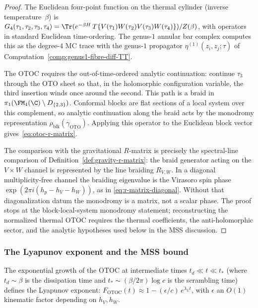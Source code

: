\begin{proof}
The Euclidean four-point function on the thermal cylinder
(inverse temperature~$\beta$) is
$G_4(\tau_1,\tau_2,\tau_3,\tau_4)
= \Tr(e^{-\beta H}\,T\{V(\tau_1)W(\tau_2)V(\tau_3)W(\tau_4)\})
/ Z(\beta)$,
with operators in standard Euclidean time-ordering.
The genus-$1$ annular bar complex computes this as the degree-$4$
MC trace with the genus-$1$ propagator
$\eta^{(1)}(z_i, z_j; \tau)$ of
Computation~\ref{comp:genus1-fibre-diff-TT}.

The OTOC requires the out-of-time-ordered analytic continuation:
continue $\tau_3$ through the OTO sheet so that, in the holomorphic
configuration variable, the third insertion winds once around the
second.  This path is a braid in
\(\pi_1(\FM_4(\C)\setminus D_{\{2,3\}})\).  Conformal blocks are
flat sections of a local system over this complement, so analytic
continuation along the braid acts by the monodromy representation
\(\rho_{\mathrm{blk}}(\gamma_{\mathrm{OTO}})\).  Applying this operator
to the Euclidean block vector gives~\eqref{eq:otoc-r-matrix}.

The comparison with the gravitational \(R\)-matrix is precisely the
spectral-line comparison of Definition~\ref{def:gravity-r-matrix}: the
braid generator acting on the \(V\times W\) channel is represented by
the line braiding \(R_{V,W}\).  In a diagonal multiplicity-free channel
the braiding eigenvalue is the Virasoro spin phase
\(\exp(2\pi i(h_p-h_V-h_W))\), as in
\eqref{eq:r-matrix-diagonal}.  Without that diagonalization datum the
monodromy is a matrix, not a scalar phase.  The proof stops at the
block-local-system monodromy statement; reconstructing the normalized
thermal OTOC requires the thermal coefficients, the anti-holomorphic
sector, and the analytic hypotheses used below in the MSS discussion.
\end{proof}

\subsubsection*{The Lyapunov exponent and the MSS bound}

The exponential growth of the OTOC at intermediate times
$t_d \ll t \ll t_*$ (where $t_d \sim \beta$ is the dissipation
time and $t_* \sim (\beta/2\pi)\log c$ is the scrambling time)
defines the Lyapunov exponent:
$F_{\mathrm{OTOC}}(t) \approx 1 - (\epsilon/c)\,e^{\lambda_L t}$,
with $\epsilon$ an $O(1)$ kinematic factor depending on
$h_V, h_W$.

